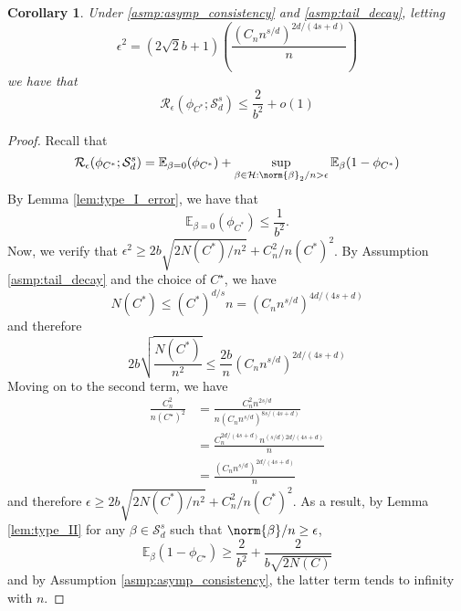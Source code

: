 \documentclass{article}
\newcommand{\1}{\mathbb{I}}
\newcommand{\Ebb}{\mathbb{E}}
\theoremstyle{alden}
\theoremstyle{aldenthm}
\newtheorem{corollary}{Corollary}
\theoremstyle{definition}
\theoremstyle{remark}
\begin{document}
\begin{corollary}
	\label{cor:critical_radius}
	Under \ref{asmp:asymp_consistency} and \ref{asmp:tail_decay}, 
	letting
	\begin{equation*}
	\epsilon^2 = (2\sqrt{2}b + 1) \left(\frac{(C_n n^{s/d})^{2d/(4s + d)}}{n}\right)
	\end{equation*}
	we have that
	\begin{equation*}
	\mathcal{R}_{\epsilon}(\phi_{C^*};\mathcal{S}_d^s) \leq \frac{2}{b^2} + o(1)
	\end{equation*}
\end{corollary}
\begin{proof}
	Recall that
	\begin{equation*}
	\mathcal{R}_{\epsilon}(\phi_{C^*};\mathcal{S}_d^s) = \Ebb_{\beta = 0}(\phi_{C^*}) + \sup_{\beta \in \mathcal{H}:\norm{\beta}_2/n > \epsilon} \Ebb_{\beta}(1 - \phi_{C^*})
	\end{equation*} 
	By Lemma \ref{lem:type_I_error}, we have that
	\begin{equation*}
	\Ebb_{\beta = 0}(\phi_{C^*}) \leq \frac{1}{b^2}.
	\end{equation*}
	Now, we verify that $\epsilon^2 \geq 2b\sqrt{2N(C^*)/n^2} + C_n^2/n(C^*)^2$. By Assumption \ref{asmp:tail_decay} and the choice of $C^{\star}$, we have
	\begin{equation*}
	N(C^*) \leq (C^*)^{d/s}n = (C_n n^{s/d})^{4d/(4s + d)}
	\end{equation*}
	and therefore
	\begin{equation*}
	2b\sqrt{\frac{N(C^*)}{n^2}} \leq \frac{2b}{n} (C_n n^{s/d})^{2d/(4s+d)}
	\end{equation*}
	Moving on to the second term, we have
	\begin{align*}
	\frac{C_n^2}{n(C^{\star})^2} & = \frac{C_n^2n^{2s/d}}{n(C_nn^{s/d})^{8s/(4s+d)}} \\
	& = \frac{C_n^{2d/(4s + d)}n^{(s/d)2d/(4s + d)}}{n} \\
	& = \frac{(C_n n^{s/d})^{2d/(4s + d)}}{n}
	\end{align*}
	and therefore $\epsilon \geq 2b\sqrt{2N(C^*)/n^2} + C_n^2/n(C^*)^2$. As a result, by Lemma \ref{lem:type_II} for any $\beta \in \mathcal{S}^s_d$ such that $\norm{\beta}/n \geq \epsilon$, 
	\begin{equation*}
	\Ebb_{\beta}(1 - \phi_{C^{\star}}) \geq \frac{2}{b^2} + \frac{2}{b\sqrt{2N(C)}}
	\end{equation*}
	and by Assumption \ref{asmp:asymp_consistency}, the latter term tends to infinity with $n$.
\end{proof}
\end{document}
